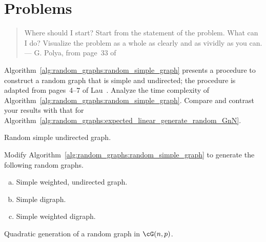 
\section{Problems}

\begin{quote}
\footnotesize
Where should I start? Start from the statement of the problem. What
can I do? Visualize the problem as a whole as clearly and as vividly
as you can. \\
\noindent
--- G. Polya, from page~33 of~\cite{Polya1957}
\end{quote}

\begin{problem}
\item Algorithm~\ref{alg:random_graphs:random_simple_graph} presents a
  procedure to construct a random graph that is simple and undirected;
  the procedure is adapted from pages~4--7 of
  Lau~\cite{Lau2007}. Analyze the time complexity of
  Algorithm~\ref{alg:random_graphs:random_simple_graph}. Compare and
  contrast your results with that for
  Algorithm~\ref{alg:random_graphs:expected_linear_generate_random_GnN}.

\begin{algorithm}[!htbp]

\caption{Random simple undirected graph.}
\label{alg:random_graphs:random_simple_graph}
\end{algorithm}

\item Modify Algorithm~\ref{alg:random_graphs:random_simple_graph} to
  generate the following random graphs.
  \begin{enumerate}[(a)]
  \item Simple weighted, undirected graph.

  \item Simple digraph.

  \item Simple weighted digraph.
  \end{enumerate}

\begin{algorithm}[!htbp]

\caption{Quadratic generation of a random graph in $\cG(n,p)$.}
\label{alg:random_graphs:quadratic_generate_random_Gnp}
\end{algorithm}


\end{problem}
